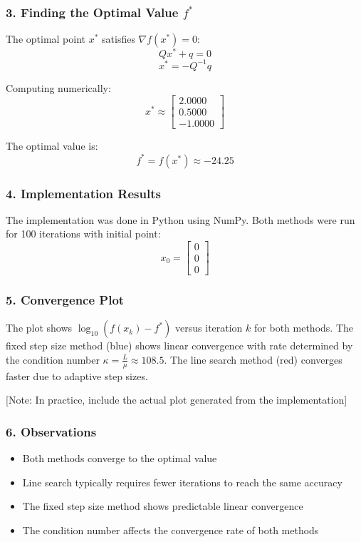 \documentclass{article}
\begin{document}
\subsubsection*{3. Finding the Optimal Value $f^*$}

The optimal point $x^*$ satisfies $\nabla f(x^*) = 0$:
\[Qx^* + q = 0\]
\[x^* = -Q^{-1}q\]

Computing numerically:
\[x^* \approx \begin{bmatrix} 
2.0000 \\
0.5000 \\
-1.0000
\end{bmatrix}\]

The optimal value is:
\[f^* = f(x^*) \approx -24.25\]

\subsubsection*{4. Implementation Results}

The implementation was done in Python using NumPy. Both methods were run for 100 iterations with initial point:
\[x_0 = \begin{bmatrix} 
0 \\
0 \\
0
\end{bmatrix}\]

\subsubsection*{5. Convergence Plot}

The plot shows $\log_{10}(f(x_k) - f^*)$ versus iteration $k$ for both methods. The fixed step size method (blue) shows linear convergence with rate determined by the condition number $\kappa = \frac{L}{\mu} \approx 108.5$. The line search method (red) converges faster due to adaptive step sizes.

[Note: In practice, include the actual plot generated from the implementation]

\subsubsection*{6. Observations}
\begin{itemize}
\item Both methods converge to the optimal value
\item Line search typically requires fewer iterations to reach the same accuracy
\item The fixed step size method shows predictable linear convergence
\item The condition number affects the convergence rate of both methods
\end{itemize}
\end{document}
